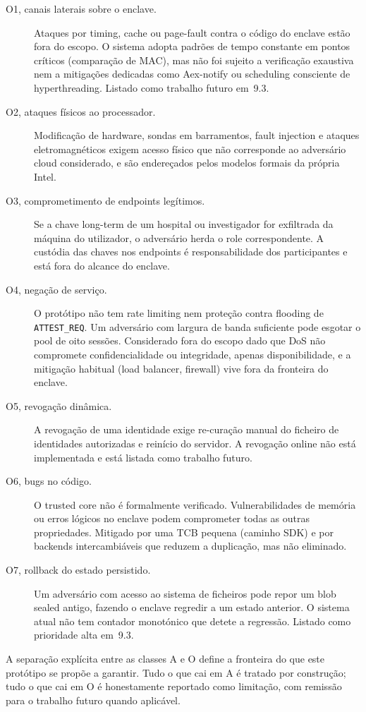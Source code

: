 \begin{description}
  \item[O1, canais laterais sobre o enclave.] Ataques por timing, cache ou page-fault contra o código do enclave estão fora do escopo. O sistema adopta padrões de tempo constante em pontos críticos (comparação de MAC), mas não foi sujeito a verificação exaustiva nem a mitigações dedicadas como Aex-notify ou scheduling consciente de hyperthreading. Listado como trabalho futuro em~9.3.
  \item[O2, ataques físicos ao processador.] Modificação de hardware, sondas em barramentos, fault injection e ataques eletromagnéticos exigem acesso físico que não corresponde ao adversário cloud considerado, e são endereçados pelos modelos formais da própria Intel.
  \item[O3, comprometimento de endpoints legítimos.] Se a chave long-term de um hospital ou investigador for exfiltrada da máquina do utilizador, o adversário herda o role correspondente. A custódia das chaves nos endpoints é responsabilidade dos participantes e está fora do alcance do enclave.
  \item[O4, negação de serviço.] O protótipo não tem rate limiting nem proteção contra flooding de \texttt{ATTEST\_REQ}. Um adversário com largura de banda suficiente pode esgotar o pool de oito sessões. Considerado fora do escopo dado que DoS não compromete confidencialidade ou integridade, apenas disponibilidade, e a mitigação habitual (load balancer, firewall) vive fora da fronteira do enclave.
  \item[O5, revogação dinâmica.] A revogação de uma identidade exige re-curação manual do ficheiro de identidades autorizadas e reinício do servidor. A revogação online não está implementada e está listada como trabalho futuro.
  \item[O6, bugs no código.] O trusted core não é formalmente verificado. Vulnerabilidades de memória ou erros lógicos no enclave podem comprometer todas as outras propriedades. Mitigado por uma TCB pequena (caminho SDK) e por backends intercambiáveis que reduzem a duplicação, mas não eliminado.
  \item[O7, rollback do estado persistido.] Um adversário com acesso ao sistema de ficheiros pode repor um blob sealed antigo, fazendo o enclave regredir a um estado anterior. O sistema atual não tem contador monotónico que detete a regressão. Listado como prioridade alta em~9.3.
\end{description}

A separação explícita entre as classes A e O define a fronteira do que este protótipo se propõe a garantir. Tudo o que cai em A é tratado por construção; tudo o que cai em O é honestamente reportado como limitação, com remissão para o trabalho futuro quando aplicável.

